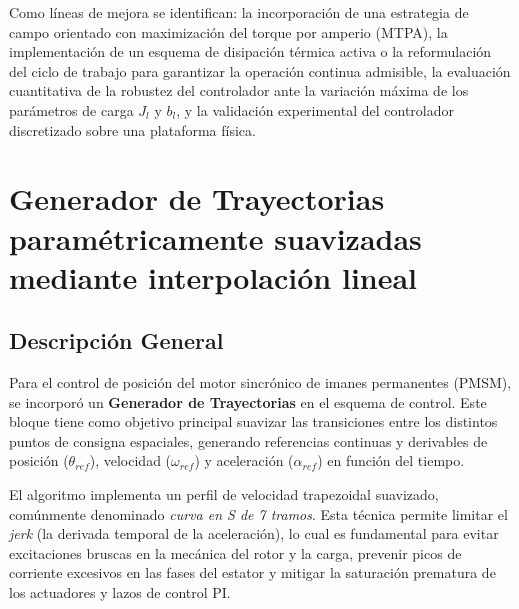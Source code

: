 \documentclass[12pt, a4paper,journal, onecolumn, compsoc]{IEEEtran}
\begin{document}
Como líneas de mejora se identifican: la incorporación de una estrategia de campo orientado con maximización del torque por amperio (MTPA), la implementación de un esquema de disipación térmica activa o la reformulación del ciclo de trabajo para garantizar la operación continua admisible, la evaluación cuantitativa de la robustez del controlador ante la variación máxima de los parámetros de carga $J_l$ y $b_l$, y la validación experimental del controlador discretizado sobre una plataforma física.











\appendices
\section{Generador de Trayectorias paramétricamente suavizadas mediante interpolación lineal}
\subsection{Descripción General}
Para el control de posición del motor sincrónico de imanes permanentes (PMSM), se incorporó un \textbf{Generador de Trayectorias} en el esquema de control. Este bloque tiene como objetivo principal suavizar las transiciones entre los distintos puntos de consigna espaciales, generando referencias continuas y derivables de posición ($\theta_{ref}$), velocidad ($\omega_{ref}$) y aceleración ($\alpha_{ref}$) en función del tiempo. 

El algoritmo implementa un perfil de velocidad trapezoidal suavizado, comúnmente denominado \textit{curva en S de 7 tramos}. Esta técnica permite limitar el \textit{jerk} (la derivada temporal de la aceleración), lo cual es fundamental para evitar excitaciones bruscas en la mecánica del rotor y la carga, prevenir picos de corriente excesivos en las fases del estator y mitigar la saturación prematura de los actuadores y lazos de control PI.
\end{document}
